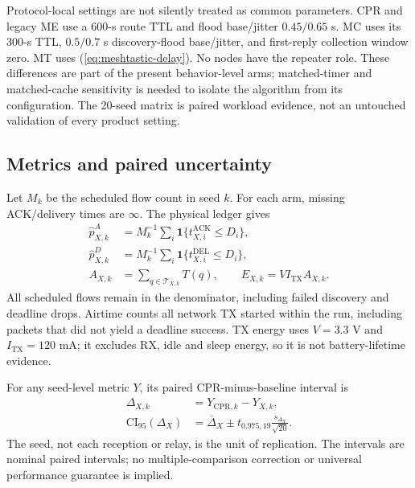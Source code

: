 \documentclass[conference,letterpaper,10pt]{IEEEtran}
\begin{document}
Protocol-local settings are not silently treated as common parameters.
CPR and legacy ME use a 600-s route TTL and flood base/jitter
$0.45/0.65$ s. MC uses its 300-s TTL, $0.5/0.7$ s discovery-flood
base/jitter, and first-reply collection window zero.
MT uses (\ref{eq:meshtastic-delay}). No nodes have the repeater role.
These differences are part of the present behavior-level arms; matched-timer
and matched-cache sensitivity is needed to isolate the algorithm from its
configuration. The 20-seed matrix is paired workload evidence, not an
untouched validation of every product setting.

\subsection{Metrics and paired uncertainty}
Let $M_k$ be the scheduled flow count in seed $k$.
For each arm, missing ACK/delivery times are $\infty$.
The physical ledger gives
\begin{equation}
\begin{aligned}
\widehat p_{X,k}^{A}
 &=M_k^{-1}\sum_i\mathbf 1\{t_{X,i}^{\mathrm{ACK}}\leq D_i\},\\
\widehat p_{X,k}^{D}
 &=M_k^{-1}\sum_i\mathbf 1\{t_{X,i}^{\mathrm{DEL}}\leq D_i\},\\
A_{X,k}&=\sum_{q\in\mathcal T_{X,k}}T(q),\qquad
E_{X,k}=V I_{\mathrm{TX}} A_{X,k}.
\end{aligned}
\label{eq:ledger-metrics}
\end{equation}
All scheduled flows remain in the denominator, including failed discovery
and deadline drops. Airtime counts all network TX started within the run,
including packets that did not yield a deadline success.
TX energy uses $V=3.3$ V and $I_{\mathrm{TX}}=120$ mA; it excludes RX,
idle and sleep energy, so it is not battery-lifetime evidence.

For any seed-level metric $Y$, its paired CPR-minus-baseline interval is
\begin{equation}
\begin{aligned}
\Delta_{X,k}&=Y_{\mathrm{CPR},k}-Y_{X,k},\\
\mathrm{CI}_{95}(\Delta_X)
 &=\bar\Delta_X\pm t_{0.975,19}\frac{s_{\Delta_X}}{\sqrt{20}}.
\end{aligned}
\label{eq:paired-ci}
\end{equation}
The seed, not each reception or relay, is the unit of replication.
The intervals are nominal paired intervals; no multiple-comparison
correction or universal performance guarantee is implied.
\end{document}
